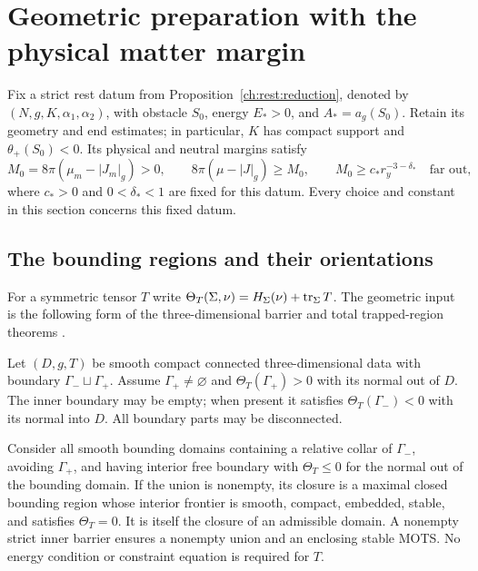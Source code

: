\section{Geometric preparation with the physical matter margin}
\label{ch:prep:section}

Fix a strict rest datum from Proposition~\ref{ch:rest:reduction}, denoted
by $(N,g,K,\alpha_1,\alpha_2)$, with obstacle $S_0$, energy $E_*>0$,
and $A_*=a_g(S_0)$. Retain its geometry and end estimates; in
particular, $K$ has compact support and $\theta_+(S_0)<0$.
Its physical and neutral margins satisfy
\begin{equation}\label{ch:prep:margin}
 M_0=8\pi(\mu_m-|J_m|_g)>0,
 \qquad 8\pi(\mu-|J|_g)\geq M_0,
 \qquad M_0\geq c_*r_y^{-3-\delta_*}
 \quad\text{far out},
\end{equation}
where $c_*>0$ and $0<\delta_*<1$ are fixed for this datum.
Every choice and constant in this section concerns this fixed datum.

\subsection{The bounding regions and their orientations}

For a symmetric tensor $T$ write
$\Theta_T(\Sigma,\nu)=H_\Sigma(\nu)+\operatorname{tr}_\Sigma T$.
The geometric input is the following form of the three-dimensional
barrier and total trapped-region theorems
\cite[Section~2, Theorems~3.1 and~4.1, Definitions~7.1--7.2,
and Theorem~7.3]{AnderssonMetzger2009}.

\begin{theorem}
\label{ch:prep:region-theorem}
Let $(D,g,T)$ be smooth compact connected three-dimensional data with boundary
$\Gamma_-\sqcup\Gamma_+$.  Assume $\Gamma_+\ne\varnothing$ and
$\Theta_T(\Gamma_+)>0$ with its normal out of $D$.  The inner boundary
may be empty; when present it satisfies $\Theta_T(\Gamma_-)<0$ with
its normal into $D$.  All boundary parts may be disconnected.

Consider all smooth bounding domains containing a relative collar
of $\Gamma_-$, avoiding $\Gamma_+$, and having interior free boundary
with $\Theta_T\leq0$ for the normal out of the bounding domain.
If the union is nonempty, its closure is a maximal
closed bounding region whose interior frontier is smooth, compact,
embedded, stable, and satisfies $\Theta_T=0$.  It is itself the
closure of an admissible domain.  A nonempty strict inner barrier
ensures a nonempty union and an enclosing stable MOTS.
No energy condition or constraint equation is required for $T$.
\end{theorem}


